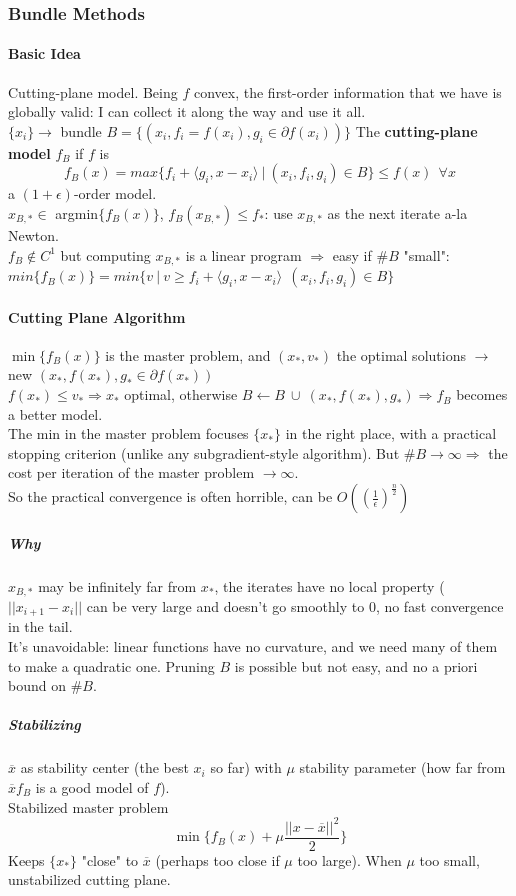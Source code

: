 \documentclass[10pt]{report}
\begin{document}
\subsubsection{Bundle Methods}
\paragraph{Basic Idea} Cutting-plane model. Being $f$ convex, the first-order information that we have is globally valid: I can collect it along the way and use it all.\\
$\{x_i\}\rightarrow$ bundle $B=\{(x_i, f_i = f(x_i), g_i\in\partial f(x_i))\}$
The \textbf{cutting-plane model} $f_B$ if $f$ is $$f_B(x) = max\{f_i+\langle g_i, x-x_i\rangle\:|\:(x_i, f_i, g_i)\in B\}\leq f(x)\:\:\forall x$$ a $(1+\epsilon)$-order model.\\
$x_{B,*}\in$ argmin$\{f_B(x)\}$, $f_B(x_{B,*})\leq f_*$: use $x_{B,*}$ as the next iterate a-la Newton.\\
$f_B\not\in C^1$ but computing $x_{B,*}$ is a linear program $\Rightarrow$ easy if $\# B$ "small": $min\{f_B(x)\}=min\{v\:|\:v\geq f_i+\langle g_i, x-x_i\rangle\:\:(x_i, f_i, g_i)\in B\}$
\paragraph{Cutting Plane Algorithm} $\min\{f_B(x)\}$ is the master problem, and $(x_*, v_*)$ the optimal solutions $\rightarrow$ new $(x_*, f(x_*), g_*\in\partial f(x_*))$\\
$f(x_*)\leq v_*\Rightarrow x_*$ optimal, otherwise $B\leftarrow B\:\cup\:(x_*, f(x_*), g_*)\Rightarrow f_B$ becomes a better model.\\
The min in the master problem focuses $\{x_*\}$ in the right place, with a practical stopping criterion (unlike any subgradient-style algorithm). But $\#B\rightarrow\infty\Rightarrow$ the cost per iteration of the master problem $\rightarrow\infty$.\\
So the practical convergence is often horrible, can be $O\left( \left(\frac{1}{\epsilon}\right)^{\frac{n}{2}}\right)$
\subparagraph{Why} $x_{B,*}$ may be infinitely far from $x_*$, the iterates have no local property ($||x_{i+1}-x_i||$ can be very large and doesn't go smoothly to $0$, no fast convergence in the tail.\\
It's unavoidable: linear functions have no curvature, and we need many of them to make a quadratic one. Pruning $B$ is possible but not easy, and no a priori bound on $\# B$.
\subparagraph{Stabilizing} $\overline{x}$ as stability center (the best $x_i$ so far) with $\mu$ stability parameter (how far from $\overline{x} f_B$ is a good model of $f$).\\
Stabilized master problem $$\min\{f_B(x)+\mu\frac{||x-\overline{x}||^2}{2}\}$$ Keeps $\{x_*\}$ "close" to $\overline{x}$ (perhaps too close if $\mu$ too large). When $\mu$ too small, unstabilized cutting plane.
\end{document}
